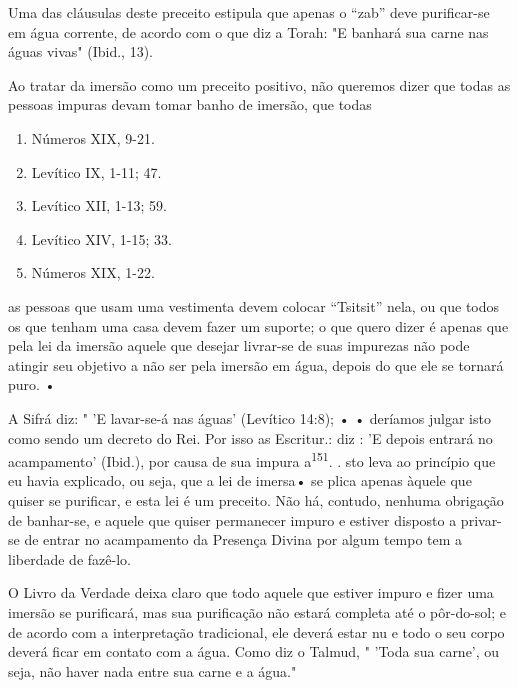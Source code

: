 Uma das cláusulas deste preceito estipula que apenas o ``zab'' deve
purificar-se em água corrente, de acordo com o que diz a Torah: "E
banhará sua carne nas águas vivas" (Ibid., 13).

Ao tratar da imersão como um preceito positivo, não queremos di­zer que
todas as pessoas impuras devam tomar banho de imersão, que todas


\begin{enumerate}
\def\labelenumi{\arabic{enumi}.}
\setcounter{enumi}{145}
\item
 
 Números XIX, 9-21.
 
\item
 
 Levítico IX, 1-11; 47.
 
\item
 
 Levítico XII, 1-13; 59.
 
\item
 
 Levítico XIV, 1-15; 33.
 
\item
 
 Números XIX, 1-22.
 
\end{enumerate}




as pessoas que usam uma vestimenta devem colocar ``Tsitsit'' nela, ou que
to­dos os que tenham uma casa devem fazer um suporte; o que quero dizer
é ape­nas que pela lei da imersão aquele que desejar livrar-se de suas
impurezas não pode atingir seu objetivo a não ser pela imersão em água,
depois do que ele se tornará puro. •

A Sifrá diz: " 'E lavar-se-á nas águas' (Levítico 14:8); • • deríamos
jul­gar isto como sendo um decreto do Rei. Por isso as Escritur.: diz :
'E depois entrará no acampamento' (Ibid.), por causa de sua impura
a\textsuperscript{151}. . sto leva ao princípio que eu
havia explicado, ou seja, que a lei de imersa• se plica apenas àquele
que quiser se purificar, e esta lei é um preceito. Não há, contudo,
ne­nhuma obrigação de banhar-se, e aquele que quiser permanecer impuro e
esti­ver disposto a privar-se de entrar no acampamento da Presença
Divina por al­gum tempo tem a liberdade de fazê-lo.

O Livro da Verdade deixa claro que todo aquele que estiver impuro e
fizer uma imersão se purificará, mas sua purificação não estará completa
até o pôr-do-sol; e de acordo com a interpretação tradicional, ele
deverá estar nu e todo o seu corpo deverá ficar em contato com a água.
Como diz o Talmud, " 'Toda sua carne', ou seja, não haver nada entre sua
carne e a água."

